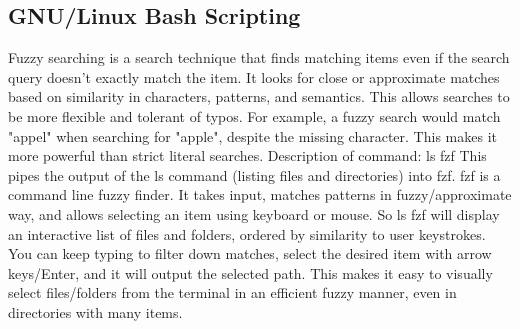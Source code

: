 \documentclass [ titlepage ]{article}
\begin{document}
\subsection{GNU/Linux Bash Scripting}
Fuzzy searching is a search technique that finds matching items even if the search query doesn't exactly match the item. It looks for close or
 approximate matches based on similarity in characters, patterns, and semantics. This allows searches to be more flexible and tolerant of
 typos.\newline
For example, a fuzzy search would match "appel" when searching for "apple", despite the missing character. This makes it more powerful than
 strict literal searches. \newline
Description of command: ls \textbar \space fzf \newline
This pipes the output of the ls command (listing files and directories) into fzf. \newline
fzf is a command line fuzzy finder. It takes input, matches patterns in fuzzy/approximate way, and allows selecting an item using keyboard or
 mouse. \newline
So ls \textbar \space fzf will display an interactive list of files and folders, ordered by similarity to user keystrokes. You can keep typing to filter down
 matches, select the desired item with arrow keys/Enter, and it will output the selected path. \newline
This makes it easy to visually select files/folders from the terminal in an efficient fuzzy manner, even in directories with many items. \newline
\end{document}
